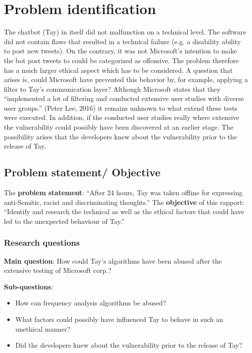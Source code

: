 \chapter{Problem identification}
The chatbot (Tay) in itself did not malfunction on a technical level. The software did not contain flaws that resulted in a technical failure (e.g. a disability ability to post new tweets). On the contrary, it was not Microsoft’s intention to make the bot post tweets to could be categorized as offensive. The problem therefore has a much larger ethical aspect which has to be considered.
A question that arises is, could Microsoft have prevented this behavior by, for example, applying a filter to Tay’s communication layer? Although Microsoft states that they “implemented a lot of filtering and conducted extensive user studies with diverse user groups.” (Peter Lee, 2016) it remains unknown to what extend these tests were executed. In addition, if the conducted user studies really where extensive the vulnerability could possibly have been discovered at an earlier stage. The possibility arises that the developers knew about the vulnerability prior to the release of Tay.

\section{Problem statement/ Objective}
The \textbf{problem statement}: “After 24 hours, Tay was taken offline for expressing anti-Semitic, racist and discriminating thoughts.”
The \textbf{objective} of this rapport: “Identify and research the technical as well as the ethical factors that could have led to the unexpected behaviour of Tay.”

\subsection{Research questions}
\textbf{Main question}: How could Tay’s algorithms have been abused after the extensive testing of Microsoft corp.?

\textbf{Sub-questions}:
\begin{itemize}
	\item How can frequency analysis algorithms be abused?
	\item What factors could possibly have influenced Tay to behave in such an unethical manner?
	\item Did the developers knew about the vulnerability prior to the release of Tay?
\end{itemize}